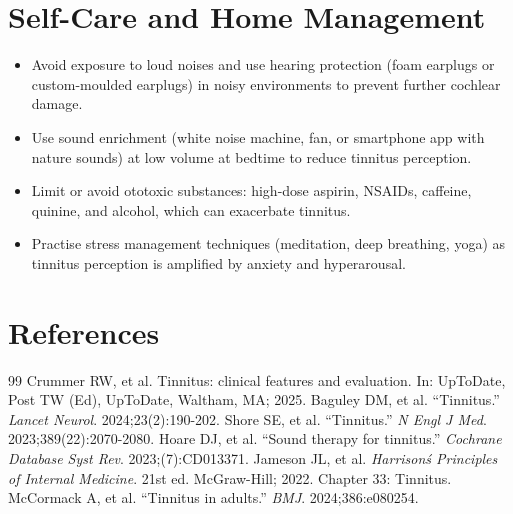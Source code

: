 \section*{Self-Care and Home Management}
\begin{itemize}
  \item Avoid exposure to loud noises and use hearing protection (foam earplugs or custom-moulded earplugs) in noisy environments to prevent further cochlear damage.
  \item Use sound enrichment (white noise machine, fan, or smartphone app with nature sounds) at low volume at bedtime to reduce tinnitus perception.
  \item Limit or avoid ototoxic substances: high-dose aspirin, NSAIDs, caffeine, quinine, and alcohol, which can exacerbate tinnitus.
  \item Practise stress management techniques (meditation, deep breathing, yoga) as tinnitus perception is amplified by anxiety and hyperarousal.
\end{itemize}

\section*{References}
\begin{thebibliography}{99}
 Crummer RW, et al. Tinnitus: clinical features and evaluation. In: UpToDate, Post TW (Ed), UpToDate, Waltham, MA; 2025.
 Baguley DM, et al. ``Tinnitus.'' \emph{Lancet Neurol}. 2024;23(2):190-202.
 Shore SE, et al. ``Tinnitus.'' \emph{N Engl J Med}. 2023;389(22):2070-2080.
 Hoare DJ, et al. ``Sound therapy for tinnitus.'' \emph{Cochrane Database Syst Rev}. 2023;(7):CD013371.
 Jameson JL, et al. \emph{Harrison\'s Principles of Internal Medicine}. 21st ed. McGraw-Hill; 2022. Chapter 33: Tinnitus.
 McCormack A, et al. ``Tinnitus in adults.'' \emph{BMJ}. 2024;386:e080254.
\end{thebibliography}
